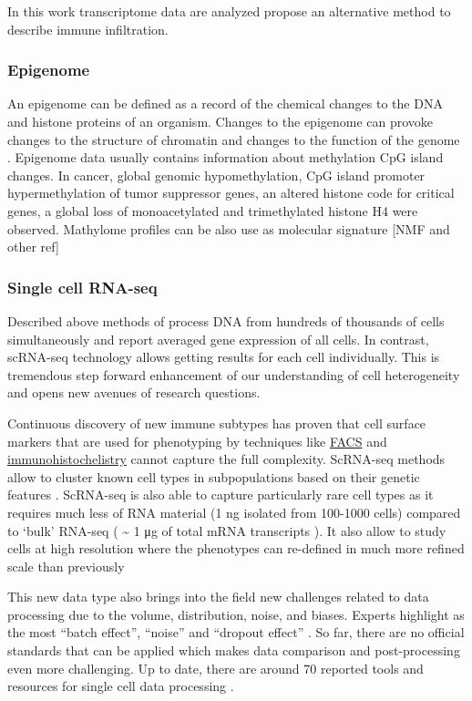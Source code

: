 \documentclass[12pt,]{book}
\theoremstyle{definition}
\theoremstyle{definition}
\theoremstyle{definition}
\theoremstyle{remark}
\begin{document}
In this work transcriptome data are analyzed propose an alternative
method to describe immune infiltration.

\hypertarget{epigenome}{%
\subsubsection{Epigenome}\label{epigenome}}

An epigenome can be defined as a record of the chemical changes to the
DNA and histone proteins of an organism. Changes to the epigenome can
provoke changes to the structure of chromatin and changes to the
function of the genome \citep{Bernstein2007}. Epigenome data usually
contains information about methylation CpG island changes. In cancer,
global genomic hypomethylation, CpG island promoter hypermethylation of
tumor suppressor genes, an altered histone code for critical genes, a
global loss of monoacetylated and trimethylated histone H4 were
observed. Mathylome profiles can be also use as molecular signature
{[}NMF and other ref{]}

\hypertarget{single-cell-rna-seq}{%
\subsubsection{Single cell RNA-seq}\label{single-cell-rna-seq}}

Described above methods of process DNA from hundreds of thousands of
cells simultaneously and report averaged gene expression of all cells.
In contrast, scRNA-seq technology allows getting results for each cell
individually. This is tremendous step forward enhancement of our
understanding of cell heterogeneity and opens new avenues of research
questions.

Continuous discovery of new immune subtypes has proven that cell surface
markers that are used for phenotyping by techniques like
\protect\hyperlink{facs}{FACS} and
\protect\hyperlink{staining}{immunohistochelistry} cannot capture the
full complexity. ScRNA-seq methods allow to cluster known cell types in
subpopulations based on their genetic features \citep{Papalexi2017}.
ScRNA-seq is also able to capture particularly rare cell types as it
requires much less of RNA material (1 ng isolated from 100-1000 cells)
compared to `bulk' RNA-seq ( \textasciitilde{} 1 μg of total mRNA
transcripts ). It also allow to study cells at high resolution where the
phenotypes can re-defined in much more refined scale than previously
\citep{Papalexi2017}

This new data type also brings into the field new challenges related to
data processing due to the volume, distribution, noise, and biases.
Experts highlight as the most ``batch effect'', ``noise'' and ``dropout
effect'' \citep{Perkel2017}. So far, there are no official standards
that can be applied which makes data comparison and post-processing even
more challenging. Up to date, there are around 70 reported tools and
resources for single cell data processing \citep{Davis2016} .
\end{document}
